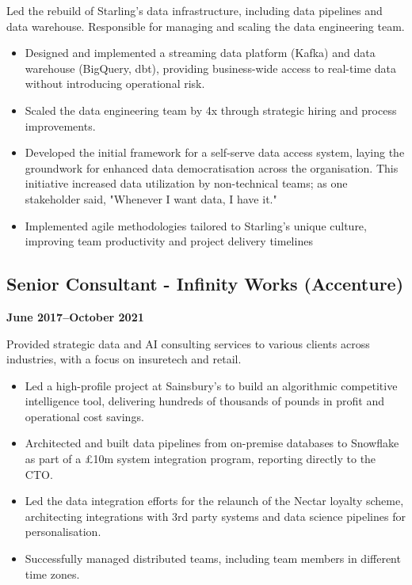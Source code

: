 \documentclass[a4paper]{scrartcl}
\begin{document}
Led the rebuild of Starling's data infrastructure, including data pipelines and data warehouse. Responsible for managing and scaling the data engineering team.
\begin{itemize}
	\item Designed and implemented a streaming data platform (Kafka) and data warehouse (BigQuery, dbt), providing business-wide access to real-time data without introducing operational risk.
	\item Scaled the data engineering team by 4x through strategic hiring and process improvements.
	\item Developed the initial framework for a self-serve data access system, laying the groundwork for enhanced data democratisation across the organisation. This initiative increased data utilization by non-technical teams; as one stakeholder said, "Whenever I want data, I have it."
	\item Implemented agile methodologies tailored to Starling's unique culture, improving team productivity and project delivery timelines
\end{itemize}

\subsection*{Senior Consultant - Infinity Works (Accenture)}
\textbf{June 2017--October 2021}

Provided strategic data and AI consulting services to various clients across industries, with a focus on insuretech and retail.
\begin{itemize}
	\item Led a high-profile project at Sainsbury's to build an algorithmic competitive intelligence tool, delivering hundreds of thousands of pounds in profit and operational cost savings.
	\item Architected and built data pipelines from on-premise databases to Snowflake as part of a £10m system integration program, reporting directly to the CTO.
	\item Led the data integration efforts for the relaunch of the Nectar loyalty scheme, architecting integrations with 3rd party systems and data science pipelines for personalisation.
	\item Successfully managed distributed teams, including team members in different time zones.
\end{itemize}
\end{document}
